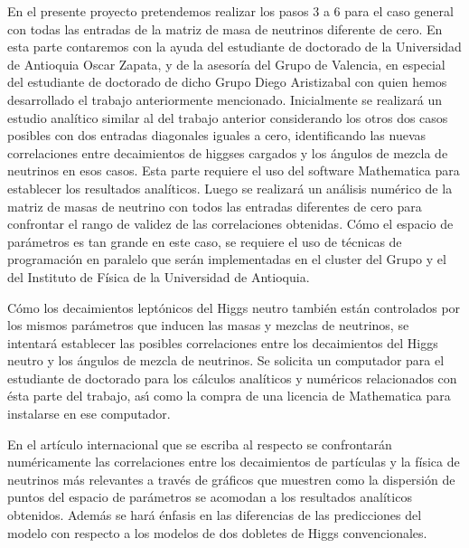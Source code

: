 \begin{ideas}
En el presente proyecto pretendemos realizar los pasos 3 a 6 para el
caso general con todas las entradas de la matriz de masa de neutrinos
diferente de cero. En esta parte contaremos con la ayuda del
estudiante de doctorado de la Universidad de Antioquia Oscar Zapata, y
de la asesoría del Grupo de Valencia, en especial del estudiante de
doctorado de dicho Grupo Diego Aristizabal con quien hemos
desarrollado el trabajo anteriormente mencionado. Inicialmente se
realizará un estudio analítico similar al del trabajo anterior
considerando los otros dos casos posibles con dos entradas diagonales
iguales a cero, identificando las nuevas correlaciones entre
decaimientos de higgses cargados y los ángulos de mezcla de neutrinos
en esos casos. Esta parte requiere el uso del software Mathematica
para establecer los resultados analíticos. Luego se realizará un
análisis numérico de la matriz de masas de neutrino con todos las
entradas diferentes de cero para confrontar el rango de validez de las
correlaciones obtenidas. Cómo el espacio de parámetros es tan grande
en este caso, se requiere el uso de técnicas de programación en
paralelo que serán implementadas en el cluster del Grupo y el del
Instituto de Física de la Universidad de Antioquia.

Cómo los decaimientos leptónicos del Higgs neutro también están
controlados por los mismos parámetros que inducen las masas y mezclas
de neutrinos, se intentará establecer las posibles correlaciones entre
los decaimientos del Higgs neutro y los ángulos de mezcla de
neutrinos. Se solicita un computador para el estudiante de doctorado
para los cálculos analíticos y numéricos relacionados con ésta parte
del trabajo, as\'\i{} como la compra de una licencia de Mathematica para
instalarse en ese computador.

En el artículo internacional que se escriba al respecto se
confrontarán numéricamente las correlaciones entre los decaimientos de
partículas y la física de neutrinos más relevantes a través de
gráficos que muestren como la dispersión de puntos del espacio de
parámetros se acomodan a los resultados analíticos obtenidos. Además
se hará énfasis en las diferencias de las predicciones del modelo con
respecto a los modelos de dos dobletes de Higgs convencionales.


\end{ideas}
